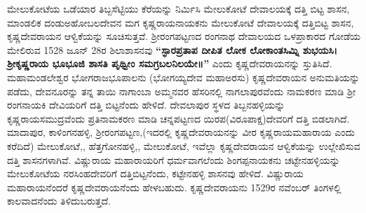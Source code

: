 ಮೇಲುಕೋಟೆಯ ಒಡೆಯಾರ ತಿಬ್ಬಸೆಟ್ಟಿಯು ಕೆರೆಯನ್ನು ನಿರ್ಮಿಸಿ ಮೇಲುಕೋಟೆ ದೇವಾಲಯಕ್ಕೆ ದತ್ತಿ ಬಿಟ್ಟ ಶಾಸನ, ಮಾಂಡಲಿಕ ದಂಡುಅಹೋಬಲದೇವನ ಮಗ ಕೃಷ್ಣರಾಯನಾಯಕನು ಮೇಲುಕೋಟೆ ದೇವಾಲಯಕ್ಕೆ ದತ್ತಿಬಿಟ್ಟ ಶಾಸನ, ಕೃಷ್ಣದೇವರಾಯನ ಆಳ್ವಿಕೆಯನ್ನು ಸೂಚಿಸುತ್ತವೆ. ಶ‍್ರೀರಂಗಪಟ್ಟಣದ ರಂಗನಾಥ ದೇವಾಲಯದ ಒಳಪ್ರಾಕಾರದ ಗೋಡೆಯ ಮೇಲಿರುವ 1528 ಜೂನ್​ 28ರ ಶಿಲಾಶಾಸನವು \textbf{“ಸ್ಫಾರಪ್ರತಾಪ ದೀಪಿತ ಲೋಕ ಲೋಕಾಂತಸಿಮ್ನಿ ಶುಭಯಸಿ। ಶ‍್ರೀಕೃಷ್ಣರಾಯ ಭೂಭೂಜಿ ಶಾಸತಿ ಪೃಥ್ವೀಂ ಸಮಗ್ರಬಲನಿಲಯೇ॥”} ಎಂದು ಕೃಷ್ಣದೇವರಾಯನನ್ನು ಸ್ತುತಿಸಿದೆ. ಮಹಾಮಂಡಲೇಶ್ವರ ಭೋಗರಾಜಭೂಪಾಲನು (ಭೋಗಯ್ಯದೇವ ಮಹಾಅರಸು) ಕೃಷ್ಣದೇವರಾಯನ ಅನುಮತಿಯನ್ನು ಪಡೆದು, ದೇವನೂರನ್ನು ತನ್ನ ತಾಯಿ ನಾಗಾಂಬಾ ಅಮ್ಮನವರ ಹೆಸರಿನಲ್ಲಿ ನಾಗಲಾಪುರವೆಂದು ನಾಮಕರಣ ಮಾಡಿ ಶ‍್ರೀ ರಂಗನಾಯಕಿ ದೇವಿಯರಿಗೆ ದತ್ತಿ ಬಿಟ್ಟನೆಂದು ಹೇಳಿದೆ. ದೇವಲಾಪುರ ಸ್ಥಳದ ತಿಬ್ಬನಹಳ್ಳಿಯನ್ನು ಕೃಷ್ಣರಾಯಸಮುದ್ರವೆಂದು ಪ್ರತಿನಾಮಕರಣ ಮಾಡಿ ಚನ್ನಪಟ್ಟಣದ ಯಿರಪ(ವಿರೂಪಾಕ್ಷ)ದೇವರಿಗೆ ದತ್ತಿ ಬಿಡಲಾಗಿದೆ. ಮಾದಾಪುರ, ಕಾಳಿಂಗನಹಳ್ಳಿ, ಶ‍್ರೀರಂಗಪಟ್ಟಣ,\break (ಇದರಲ್ಲಿ ಕೃಷ್ಣದೇವರಾಯನನ್ನು ವೀರ ಕೃಷ್ಣರಾಯಮಹಾರಾಯ ಎಂದು ಕರೆದಿದೆ) ಮೇಲುಕೋಟೆ,, ಹೆತ್ತಗೋನಹಳ್ಳಿ,, ಮೇಲುಕೋಟೆ, ಇವೆಲ್ಲಾ ಕೃಷ್ಣದೇವರಾಯನ ಆಳ್ವಿಕೆಯನ್ನು ಉಲ್ಲೇಖಿಸುವ ದತ್ತಿ ಶಾಸನಗಳಾಗಿವೆ. ವಿಷ್ಣುರಾಯ ಮಹಾರಾಯರಿಗೆ ಧರ್ಮವಾಗಲೆಂದು ಶಿಂಗಪ್ಪನಾಯಕನು ಚಟ್ಟೇನಹಳ್ಳಿಯನ್ನು ಮೇಲುಕೋಟೆಯ ನರಸಿಂಹದೇವರಿಗೆ ದತ್ತಿಬಿಟ್ಟ\-ನೆಂದು, ಕಟ್ಟೇನಹಳ್ಳಿ ಶಾಸನವು ಹೇಳಿದೆ. ವಿಷ್ಣುರಾಯ ಮಹಾರಾಯನೆಂದರೆ ಕೃಷ್ಣದೇವರಾಯನೆಂದು ಹೇಳಬಹುದು. ಕೃಷ್ಣದೇವರಾಯನು 1529ರ ನವೆಂಬರ್​ ತಿಂಗಳಲ್ಲಿ ಕಾಲವಾದನೆಂದು ತಿಳಿದುಬರುತ್ತದೆ.

